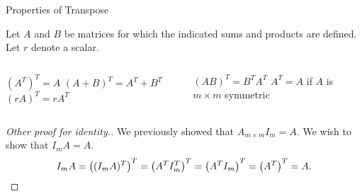 \documentclass[xcolor=dvipsnames,aspectratio=169,t]{beamer}
\begin{document}
\begin{frame}{Properties of Transpose}

\bbox
Let $A$ and $B$ be matrices for which the indicated sums and products are defined. Let $r$ denote a scalar.

\begin{columns}[T]
\column{0.5\tw}
\bb[a.]
\ii $\left( A^T \right)^T = A$  \ms
\ii $(A+B)^T = A^T + B^T$ \ms
\ii $(rA)^T = rA^T$ \ms
\ee

\column{0.5\tw}
\bb[a.]
\addtocounter{enumi}{3}
\ii $(AB)^T = B^TA^T$ \ms
\ii $A^T=A$ if $A$ is $m\times m$ symmetric
\ee
\end{columns}
\ebox

\pause
\begin{proof}[Other proof for identity.]
  We previously showed that $A_{m\times m}I_m = A$.  We wish to show that $I_m A = A$.
  \[
    I_m A 
    = \left((I_m A)^T \right)^T
    = \left(A^T I_m ^T \right)^T  
    = \left(A^T I_m \right)^T 
    = \left(A^T \right)^T = A.\qedhere
  \]
\end{proof}

\end{frame}
\end{document}
